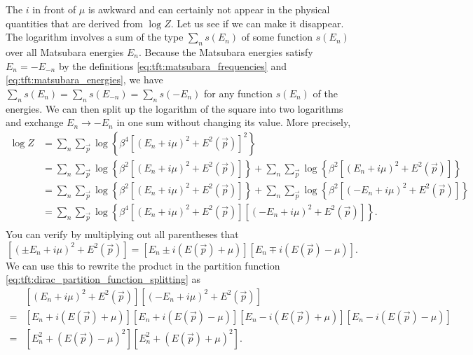 The $i$ in front of $\mu$ is awkward and can certainly not appear in the physical quantities that are derived from $\log Z$.
Let us see if we can make it disappear.
The logarithm involves a sum of the type $\sum_n s(E_n)$ of some function $s(E_n)$ over all Matsubara energies $E_n$.
Because the Matsubara energies satisfy $E_n = -E_{-n}$ by the definitions \eqref{eq:tft:matsubara_frequencies} and \eqref{eq:tft:matsubara_energies}, we have
$\sum_n s(E_n) = \sum_n s(E_{-n}) = \sum_n s(-E_n)$ for any function $s(E_n)$ of the energies.
We can then split up the logarithm of the square into two logarithms and exchange $E_n \rightarrow -E_n$ in one sum without changing its value.
More precisely,
\begin{equation}
\begin{split}
	\log Z & = \sum_n \sum_\vec{p} \log \left\{ \beta^4 \left[ (E_n + i \mu)^2 + E^2(\vec{p})  \right]^2 \right\}   \\
	       & = \sum_n \sum_\vec{p} \log \left\{ \beta^2 \left[ (E_n + i \mu)^2 + E^2(\vec{p})  \right]   \right\}
	         + \sum_n \sum_\vec{p} \log \left\{ \beta^2 \left[ (E_n + i \mu)^2 + E^2(\vec{p})  \right]   \right\}   \\
	       & = \sum_n \sum_\vec{p} \log \left\{ \beta^2 \left[ (E_n + i \mu)^2 + E^2(\vec{p})  \right]   \right\}
	         + \sum_n \sum_\vec{p} \log \left\{ \beta^2 \left[ (-E_n + i \mu)^2 + E^2(\vec{p}) \right]   \right\}   \\
	       & = \sum_n \sum_\vec{p} \log \left\{ \beta^4 \left[ (E_n + i \mu)^2 + E^2(\vec{p})  \right] 
	                                                    \left[ (-E_n + i \mu)^2 + E^2(\vec{p}) \right]   \right\} . \\
\end{split}
\label{eq:tft:dirac_partition_function_splitting}
\end{equation}
You can verify by multiplying out all parentheses that
\begin{equation}
	\left[ (\pm E_n + i \mu)^2 + E^2(\vec{p}) \right] = \left[ E_n \pm i (E(\vec{p}) + \mu) \right] \left[ E_n \mp i(E(\vec{p}) - \mu) \right] .
\end{equation}
We can use this to rewrite the product in the partition function \eqref{eq:tft:dirac_partition_function_splitting} as
\begin{equation}
\begin{split}
	 & \left[ (E_n + i \mu)^2 + E^2(\vec{p}) \right] \left[ (-E_n + i \mu)^2 + E^2(\vec{p}) \right] \\
	=& \left[ E_n + i (E(\vec{p}) + \mu) \right] \left[ E_n + i (E(\vec{p}) - \mu) \right] \left[ E_n - i (E(\vec{p}) + \mu) \right] \left[ E_n - i (E(\vec{p}) - \mu) \right] \\
	=& \left[ E_n^2 + (E(\vec{p}) - \mu)^2 \right] \left[ E_n^2 + (E(\vec{p}) + \mu)^2 \right] . \\
\end{split}
\end{equation}
